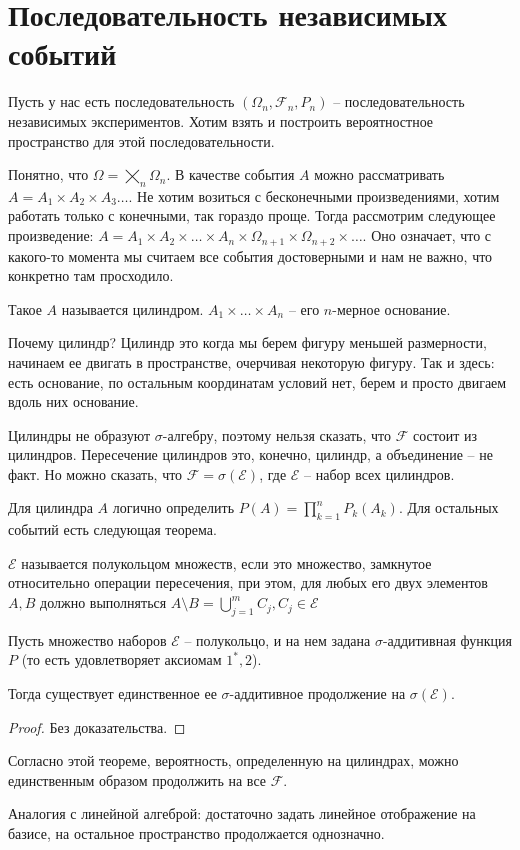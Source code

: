 \section{Последовательность независимых событий}

Пусть у нас есть последовательность $(\Omega_n, \mathcal{F}_n, P_n)$ -- последовательность независимых экспериментов.
Хотим взять и построить вероятностное пространство для этой последовательности.

Понятно, что $\Omega = \bigtimes\limits_n \Omega_n$.
В качестве события $A$ можно рассматривать $A = A_1 \times A_2 \times A_3 \dots$. 
Не хотим возиться с бесконечными произведениями, хотим работать только с конечными, так гораздо проще. 
Тогда рассмотрим следующее произведение: $A = A_1 \times A_2 \times \dots \times A_n \times \Omega_{n+1} \times \Omega_{n+2} \times \dots$.
Оно означает, что с какого-то момента мы считаем все события достоверными и нам не важно, что конкретно там просходило. 

\begin{Def}
Такое $A$ называется цилиндром. $A_1 \times \dots \times A_n$ -- его $n$-мерное основание.
\end{Def}
\begin{Rem}
Почему цилиндр? Цилиндр это когда мы берем фигуру меньшей размерности, начинаем ее двигать  в пространстве, очерчивая некоторую фигуру. 
Так и здесь: есть основание, по остальным координатам условий нет, берем и просто двигаем вдоль них основание.
\end{Rem}

Цилиндры не образуют $\sigma$-алгебру, поэтому нельзя сказать, что $\mathcal{F}$ состоит из цилиндров.
Пересечение цилиндров это, конечно, цилиндр, а объединение -- не факт. Но можно сказать, что $\mathcal{F} = \sigma(\mathcal{E})$, где $\mathcal{E}$ -- набор всех цилиндров.

Для цилиндра $A$ логично определить $P(A) = \prod\limits_{k=1}^n P_k(A_k)$. 
Для остальных событий есть следующая теорема.
\begin{Def}
$\mathcal{E}$ называется полукольцом множеств, если это множество, замкнутое относительно операции пересечения, при этом, 
для любых его двух элементов $A, B$ должно выполняться $A \setminus B = \bigcup\limits_{j=1}^m C_j, C_j \in \mathcal{E}$
\end{Def}
\begin{theorem}[Каратеодори]
Пусть множество наборов $\mathcal{E}$ -- полукольцо, и на нем задана $\sigma$-аддитивная функция $P$ (то есть удовлетворяет аксиомам $1^*, 2$).

Тогда существует единственное ее $\sigma$-аддитивное продолжение на $\sigma(\mathcal{E})$.
\end{theorem}
\begin{proof}
Без доказательства.
\end{proof}
Согласно этой теореме, вероятность, определенную на цилиндрах,  можно единственным образом продолжить на все $\mathcal{F}$.
\begin{Rem}
Аналогия с линейной алгеброй: достаточно задать линейное отображение на базисе, на остальное пространство продолжается однозначно.
\end{Rem} 

